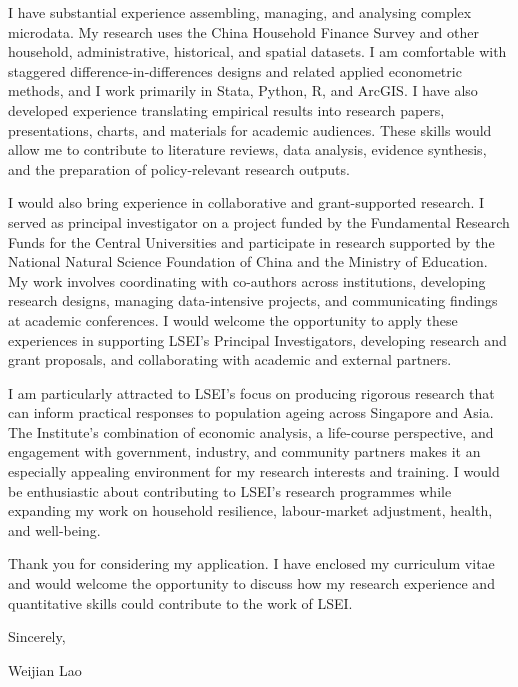 \documentclass[11pt,a4paper]{article}
\begin{document}
I have substantial experience assembling, managing, and analysing complex microdata. My research uses the China Household Finance Survey and other household, administrative, historical, and spatial datasets. I am comfortable with staggered difference-in-differences designs and related applied econometric methods, and I work primarily in Stata, Python, R, and ArcGIS. I have also developed experience translating empirical results into research papers, presentations, charts, and materials for academic audiences. These skills would allow me to contribute to literature reviews, data analysis, evidence synthesis, and the preparation of policy-relevant research outputs.

I would also bring experience in collaborative and grant-supported research. I served as principal investigator on a project funded by the Fundamental Research Funds for the Central Universities and participate in research supported by the National Natural Science Foundation of China and the Ministry of Education. My work involves coordinating with co-authors across institutions, developing research designs, managing data-intensive projects, and communicating findings at academic conferences. I would welcome the opportunity to apply these experiences in supporting LSEI's Principal Investigators, developing research and grant proposals, and collaborating with academic and external partners.

I am particularly attracted to LSEI's focus on producing rigorous research that can inform practical responses to population ageing across Singapore and Asia. The Institute's combination of economic analysis, a life-course perspective, and engagement with government, industry, and community partners makes it an especially appealing environment for my research interests and training. I would be enthusiastic about contributing to LSEI's research programmes while expanding my work on household resilience, labour-market adjustment, health, and well-being.

Thank you for considering my application. I have enclosed my curriculum vitae and would welcome the opportunity to discuss how my research experience and quantitative skills could contribute to the work of LSEI.

Sincerely,

\vspace{0.1em}

Weijian Lao
\end{document}
